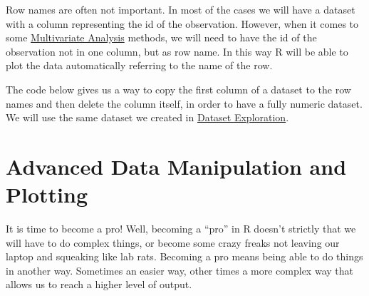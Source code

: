 \documentclass[
]{svmono}
\newenvironment{Shaded}{\begin{snugshade}}{\end{snugshade}}
\newcommand{\AttributeTok}[1]{\textcolor[rgb]{0.13,0.29,0.53}{#1}}
\newcommand{\CommentTok}[1]{\textcolor[rgb]{0.56,0.35,0.01}{\textit{#1}}}
\newcommand{\DecValTok}[1]{\textcolor[rgb]{0.00,0.00,0.81}{#1}}
\newcommand{\FunctionTok}[1]{\textcolor[rgb]{0.13,0.29,0.53}{\textbf{#1}}}
\newcommand{\NormalTok}[1]{#1}
\newcommand{\OtherTok}[1]{\textcolor[rgb]{0.56,0.35,0.01}{#1}}
\newcommand{\SpecialCharTok}[1]{\textcolor[rgb]{0.81,0.36,0.00}{\textbf{#1}}}
\newcommand{\StringTok}[1]{\textcolor[rgb]{0.31,0.60,0.02}{#1}}
\begin{document}
Row names are often not important. In most of the cases we will have a
dataset with a column representing the id of the observation. However,
when it comes to some \protect\hyperlink{multivariate-analysis}{Multivariate Analysis} methods, we will need to
have the id of the observation not in one column, but as row name. In
this way R will be able to plot the data automatically referring to the
name of the row.

The code below gives us a way to copy the first column of a dataset to
the row names and then delete the column itself, in order to have a
fully numeric dataset. We will use the same dataset we created in
\protect\hyperlink{dataset-exploration}{Dataset Exploration}.

\begin{Shaded}
\end{Shaded}

\newpage

\hypertarget{advanced-data-manipulation-and-plotting}{%
\chapter{Advanced Data Manipulation and Plotting}\label{advanced-data-manipulation-and-plotting}}

It is time to become a pro! Well, becoming a ``pro'' in R doesn't strictly
that we will have to do complex things, or become some crazy freaks not
leaving our laptop and squeaking like lab rats. Becoming a pro means
being able to do things in another way. Sometimes an easier way, other
times a more complex way that allows us to reach a higher level of
output.
\end{document}
